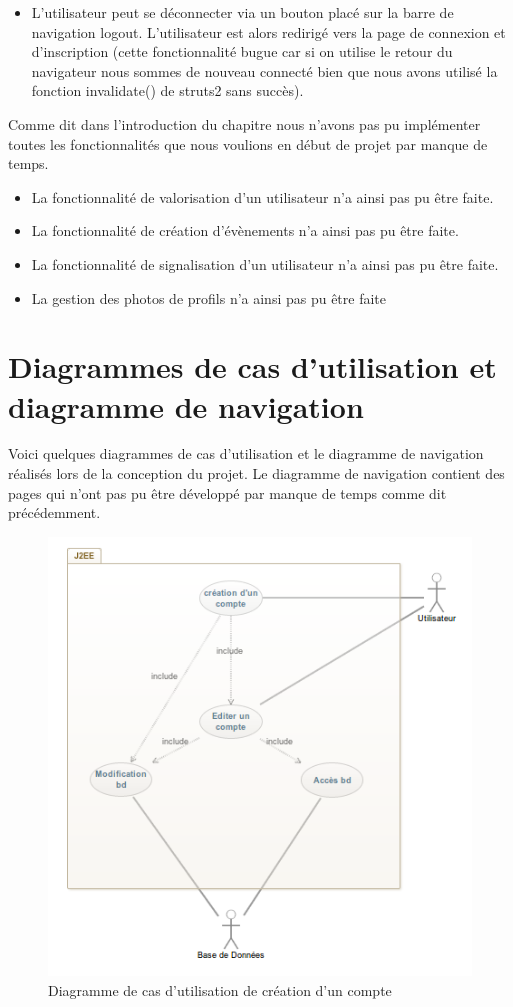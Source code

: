 \begin{itemize}
 \item L'utilisateur peut se déconnecter via un bouton placé sur la barre de navigation logout.
  L'utilisateur est alors redirigé vers la page de connexion et d'inscription (cette fonctionnalité bugue car si on utilise le retour du navigateur nous sommes de nouveau connecté bien que nous avons utilisé la fonction invalidate() de struts2 sans succès).
\end{itemize}

Comme dit dans l'introduction du chapitre nous n'avons pas pu implémenter toutes les fonctionnalités que nous voulions en début de projet par manque de temps.
\begin{itemize}
\item La fonctionnalité de valorisation d'un utilisateur n'a ainsi pas pu être faite.
\item La fonctionnalité de création d'évènements n'a ainsi pas pu être faite.
\item La fonctionnalité de signalisation d'un utilisateur n'a ainsi pas pu être faite.
\item La gestion des photos de profils n'a ainsi pas pu être faite
\end{itemize}

\newpage
\section{Diagrammes de cas d'utilisation et diagramme de navigation}

Voici quelques diagrammes de cas d'utilisation et le diagramme de navigation réalisés lors de la conception du projet. Le diagramme de navigation contient des pages qui n'ont pas pu être développé par manque de temps comme dit précédemment.
\vfill
\begin{figure}[ht!]
  \centering
   \caption{Diagramme de cas d'utilisation de création d'un compte}
   \includegraphics[scale=0.7]{cuCC}
\end{figure}

